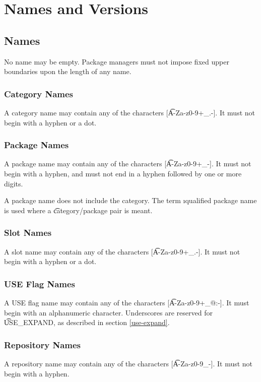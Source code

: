 \chapter{Names and Versions}

\section{Names}

No name may be empty. Package managers must not impose fixed upper boundaries upon the length of any
name.

\subsection{Category Names}
A category name may contain any of the characters [\t{A-Za-z0-9+\_.-}]. It must not begin with
a hyphen or a dot.

\subsection{Package Names}
A package name may contain any of the characters [\t{A-Za-z0-9+\_-}]. It must not begin with a
hyphen, and must not end in a hyphen followed by one or more digits.

\note A package name does not include the category. The term \i{qualified package name} is used
where a \t{category/package} pair is meant.

\subsection{Slot Names}
\label{slot-names}
A slot name may contain any of the characters [\t{A-Za-z0-9+\_.-}]. It must not begin with a
hyphen or a dot.

\subsection{USE Flag Names}
A USE flag name may contain any of the characters [\t{A-Za-z0-9+\_@:-}]. It must begin with an
alphanumeric character. Underscores are reserved for \t{USE\_EXPAND}, as described in section
\ref{use-expand}.

\subsection{Repository Names}
\label{repository-names}
A repository name may contain any of the characters [\t{A-Za-z0-9\_-}]. It must not begin with a
hyphen.

